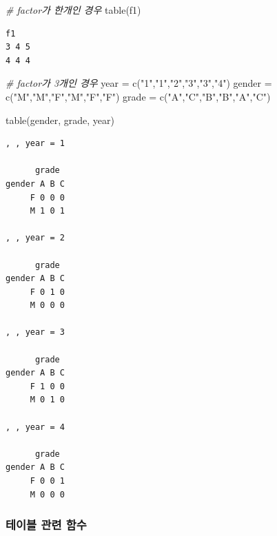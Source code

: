\documentclass[
  11pt,
]{krantz}
\newenvironment{Shaded}{\begin{snugshade}}{\end{snugshade}}
\newcommand{\CommentTok}[1]{\textcolor[rgb]{0.37,0.37,0.37}{\textit{#1}}}
\newcommand{\FunctionTok}[1]{\textcolor[rgb]{0,0,0}{#1}}
\newcommand{\NormalTok}[1]{#1}
\newcommand{\OtherTok}[1]{\textcolor[rgb]{0.37,0.37,0.37}{#1}}
\newcommand{\StringTok}[1]{\textcolor[rgb]{0.5,0.5,0.5}{#1}}
\begin{document}
\begin{Shaded}
\begin{Highlighting}[]
\CommentTok{\# factor가 한개인 경우}
\FunctionTok{table}\NormalTok{(f1)}
\end{Highlighting}
\end{Shaded}

\begin{verbatim}
f1
3 4 5 
4 4 4 
\end{verbatim}

\begin{Shaded}
\begin{Highlighting}[]
\CommentTok{\# factor가 3개인 경우}
\NormalTok{year }\OtherTok{=} \FunctionTok{c}\NormalTok{(}\StringTok{"1"}\NormalTok{,}\StringTok{"1"}\NormalTok{,}\StringTok{"2"}\NormalTok{,}\StringTok{"3"}\NormalTok{,}\StringTok{"3"}\NormalTok{,}\StringTok{"4"}\NormalTok{)}
\NormalTok{gender }\OtherTok{=} \FunctionTok{c}\NormalTok{(}\StringTok{"M"}\NormalTok{,}\StringTok{"M"}\NormalTok{,}\StringTok{"F"}\NormalTok{,}\StringTok{"M"}\NormalTok{,}\StringTok{"F"}\NormalTok{,}\StringTok{"F"}\NormalTok{)}
\NormalTok{grade }\OtherTok{=} \FunctionTok{c}\NormalTok{(}\StringTok{"A"}\NormalTok{,}\StringTok{"C"}\NormalTok{,}\StringTok{"B"}\NormalTok{,}\StringTok{"B"}\NormalTok{,}\StringTok{"A"}\NormalTok{,}\StringTok{"C"}\NormalTok{)}

\FunctionTok{table}\NormalTok{(gender, grade, year)}
\end{Highlighting}
\end{Shaded}

\begin{verbatim}
, , year = 1

      grade
gender A B C
     F 0 0 0
     M 1 0 1

, , year = 2

      grade
gender A B C
     F 0 1 0
     M 0 0 0

, , year = 3

      grade
gender A B C
     F 1 0 0
     M 0 1 0

, , year = 4

      grade
gender A B C
     F 0 0 1
     M 0 0 0
\end{verbatim}

\normalsize

\hypertarget{tab-related-fun}{%
\subsubsection*{테이블 관련 함수}\label{tab-related-fun}}
\end{document}
